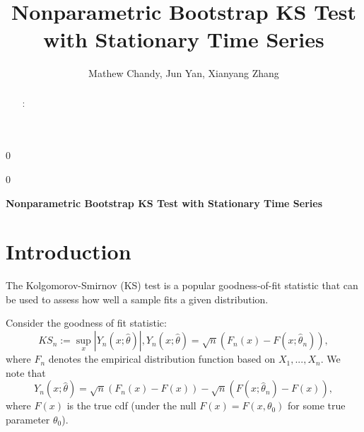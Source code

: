 \documentclass[12pt, letterpaper]{article}
\newcommand{\blind}{0}
\begin{document}

\blind
{
  \title{\bf Nonparametric Bootstrap KS Test with Stationary Time Series}
  \author{Mathew Chandy, %
  Jun Yan, %
  Xianyang Zhang\\
}
\date{}
  \maketitle
} \fi

\blind
{
  \bigskip
  \bigskip
  \bigskip
  \begin{center}
    {\LARGE\bf Nonparametric Bootstrap KS Test with Stationary Time Series}
\end{center}
  \bigskip
} \fi


\doublespace

\begin{abstract}


\bigskip
{}:
\end{abstract}


\section{Introduction}
\label{sec:intro}

The Kolgomorov-Smirnov (KS) test is a popular goodness-of-fit statistic that can
be used to assess how well a sample fits a given distribution.

Consider the goodness of fit statistic:
\begin{equation*}
KS_n := \sup_x|Y_n(x; \hat\theta)|, 
Y_n(x; \hat\theta) = \sqrt{n}(F_n(x) - F(x; \hat\theta_n)),
\end{equation*}
where $F_n$ denotes the empirical distribution function based on $X_1,...,X_n$.
We note that
\begin{equation*}
Y_n(x; \hat\theta) = \sqrt{n}(F_n(x) - F(x)) - 
\sqrt{n}(F(x; \hat\theta_n) - F(x)),
\end{equation*}
where $F(x)$ is the true cdf (under the null $F(x) = F(x, \theta_0)$ for some
true parameter $\theta_0$).
\end{document}
